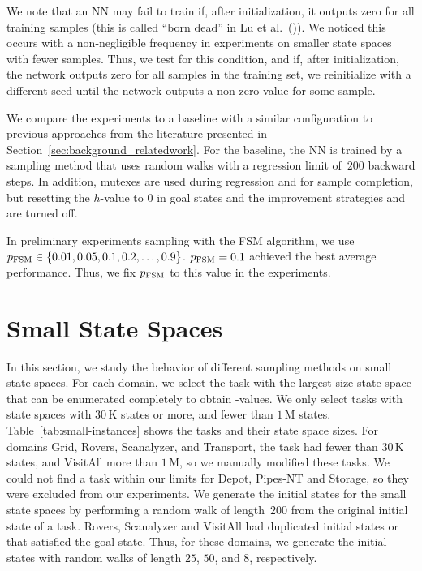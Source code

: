 We note that an NN may fail to train if, after initialization, it outputs zero for all training samples (this is called ``born dead'' in Lu et al.~(\citeyear{Lu.etal/2020})). We noticed this occurs with a non-negligible frequency in experiments on smaller state spaces with fewer samples. Thus, we test for this condition, and if, after initialization, the network outputs zero for all samples in the training set, we reinitialize with a different seed until the network outputs a non-zero value for some sample.

We compare the experiments to a baseline \hnnbase with a similar configuration to previous approaches from the literature presented in Section~\ref{sec:background_relatedwork}. For the baseline, the NN is trained by a sampling method that uses random walks with a regression limit of~$200$ backward steps. In addition, mutexes are used during regression and for sample completion, but resetting the $h$-value to $0$ in goal states and the improvement strategies \hmin and \hvfc are turned off.

In preliminary experiments sampling with the FSM algorithm, we use $p_{\text{FSM}}\in\{0.01,0.05,0.1,0.2,\ldots,0.9\}$. $p_{\text{FSM}}=0.1$ achieved the best average performance. Thus, we fix $p_{\text{FSM}}$ to this value in the experiments.

\section{Small State Spaces}
\label{sec:experiment1}

In this section, we study the behavior of different sampling methods on small state spaces. For each domain, we select the task with the largest size state space that can be enumerated completely to obtain \hstar-values. We only select tasks with state spaces with $30$\,K states or more, and fewer than $1$\,M states.  Table~\ref{tab:small-instances} shows the tasks and their state space sizes. For domains Grid, Rovers, Scanalyzer, and Transport, the task had fewer than $30$\,K states, and VisitAll more than $1$\,M, so we manually modified these tasks. We could not find a task within our limits for Depot, Pipes-NT and Storage, so they were excluded from our experiments.
We generate the initial states for the small state spaces by performing a random walk of length~$200$ from the original initial state of a task. Rovers, Scanalyzer and VisitAll had duplicated initial states or that satisfied the goal state. Thus, for these domains, we generate the initial states with random walks of length $25$, $50$, and $8$, respectively.

